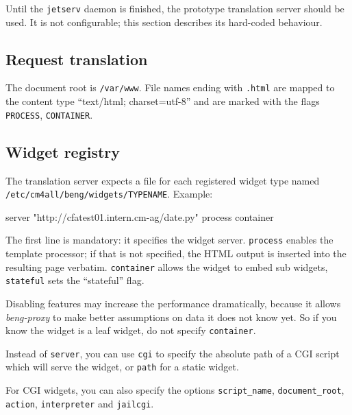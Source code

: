 \documentclass[a4paper,12pt]{article}
\begin{document}
Until the \texttt{jetserv} daemon is finished, the prototype
translation server should be used.  It is not configurable; this
section describes its hard-coded behaviour.

\subsection{Request translation}

The document root is \texttt{/var/www}.  File names ending with
\texttt{.html} are mapped to the content type ``text/html;
charset=utf-8'' and are marked with the flags \texttt{PROCESS},
\texttt{CONTAINER}.

\subsection{Widget registry}

The translation server expects a file for each registered widget type
named \texttt{/etc/cm4all/beng/widgets/TYPENAME}.  Example:

\begin{verbatim*}
server "http://cfatest01.intern.cm-ag/date.py"
process
container
\end{verbatim*}

The first line is mandatory: it specifies the widget server.
\texttt{process} enables the template processor; if that is not
specified, the HTML output is inserted into the resulting page
verbatim.  \texttt{container} allows the widget to embed sub widgets,
\texttt{stateful} sets the ``stateful'' flag.

Disabling features may increase the performance dramatically, because
it allows \emph{beng-proxy} to make better assumptions on data it does
not know yet.  So if you know the widget is a leaf widget, do not
specify \texttt{container}.

Instead of \texttt{server}, you can use \texttt{cgi} to specify the
absolute path of a CGI script which will serve the widget, or
\texttt{path} for a static widget.

For CGI widgets, you can also specify the options
\texttt{script\_name}, \texttt{docu\-ment\_root}, \texttt{action},
\texttt{interpreter} and \texttt{jailcgi}.
\end{document}
